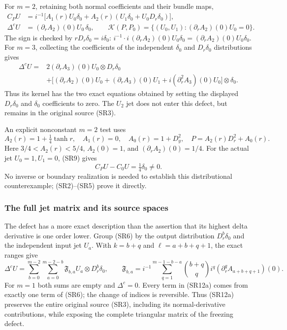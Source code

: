 \documentclass[
  11pt,
]{article}
\begin{document}
For \(m=2\), retaining both normal coefficients and their bundle maps,
\[
\begin{aligned}
C_PU&=i^{-1}\bigl[
 A_1(r)U_0\delta_0+
 A_2(r)(U_1\delta_0+U_0D_r\delta_0)\bigr],\\
\Delta^cU&=(\partial_rA_2)(0)U_0\,\delta_0,\qquad
\mathcal K(P,P_0)=\{(U_0,U_1):
                   (\partial_rA_2)(0)U_0=0\}.
\end{aligned}
\tag{SR9}
\] The sign is checked by \(rD_r\delta_0=i\delta_0\):
\(i^{-1}\cdot i\,(\partial_rA_2)(0)U_0\delta_0
=(\partial_rA_2)(0)U_0\delta_0\). For \(m=3\), collecting the
coefficients of the independent \(\delta_0\) and \(D_r\delta_0\)
distributions gives \[
\boxed{\displaystyle
\begin{aligned}
\Delta^cU={}&
2(\partial_rA_3)(0)U_0\otimes D_r\delta_0\\
&+\bigl[
(\partial_rA_2)(0)U_0+
(\partial_rA_3)(0)U_1+
i(\partial_r^2A_3)(0)U_0
\bigr]\otimes\delta_0.
\end{aligned}}
\tag{SR10}
\] Thus its kernel has the two exact equations obtained by setting the
displayed \(D_r\delta_0\) and \(\delta_0\) coefficients to zero. The
\(U_2\) jet does not enter this defect, but remains in the original
source (SR3).

An explicit nonconstant \(m=2\) test uses \[
A_2(r)=1+\tfrac14\tanh r,\quad A_1(r)=0,\quad
A_0(r)=1+D_y^2,\quad P=A_2(r)D_r^2+A_0(r).
\tag{SR11}
\] Here \(3/4<A_2(r)<5/4\), \(A_2(0)=1\), and
\((\partial_rA_2)(0)=1/4\). For the actual jet \(U_0=1,U_1=0\), (SR9)
gives \[
C_PU-C_0U=\tfrac14\delta_0\ne0.
\tag{SR12}
\] No inverse or boundary realization is needed to establish this
distributional counterexample; (SR2)--(SR5) prove it directly.

\subsubsection{The full jet matrix and its source
spaces}\label{the-full-jet-matrix-and-its-source-spaces}

The defect has a more exact description than the assertion that its
highest delta derivative is one order lower. Group (SR6) by the output
distribution \(D_r^b\delta_0\) and the independent input jet \(U_a\).
With \(k=b+q\) and \(\ell=a+b+q+1\), the exact ranges give \[
\boxed{\displaystyle
\Delta^cU
=\sum_{b=0}^{m-2}\sum_{a=0}^{m-2-b}
  \mathfrak F_{b,a}U_a\otimes D_r^b\delta_0,\qquad
\mathfrak F_{b,a}
=i^{-1}\sum_{q=1}^{m-1-b-a}
 \binom{b+q}{q}i^q
 (\partial_r^q A_{a+b+q+1})(0).}
\tag{SR12a}
\] For \(m=1\) both sums are empty and \(\Delta^c=0\). Every term in
(SR12a) comes from exactly one term of (SR6); the change of indices is
reversible. Thus (SR12a) preserves the entire original source (SR3),
including its normal-derivative contributions, while exposing the
complete triangular matrix of the freezing defect.
\end{document}
